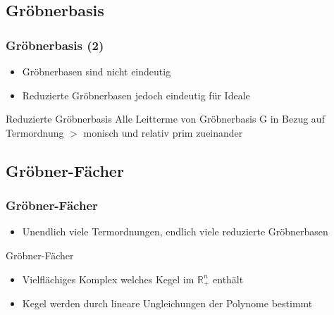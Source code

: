 \documentclass{beamer}
\begin{document}
\subsection{Gröbnerbasis}


\begin{frame}[fragile]
\frametitle{Gröbnerbasis (2)}

\begin{itemize}
\item Gröbnerbasen sind nicht eindeutig

\item Reduzierte Gröbnerbasen jedoch eindeutig für Ideale
\end{itemize}

\begin{block}{Reduzierte Gröbnerbasis}
Alle Leitterme von Gröbnerbasis G in Bezug auf Termordnung $>$ monisch und relativ prim zueinander 
\end{block}




\end{frame}







\subsection{Gröbner-Fächer}


\begin{frame}[fragile]
\frametitle{Gröbner-Fächer}
\begin{itemize}
\item Unendlich viele Termordnungen, endlich viele reduzierte Gröbnerbasen

\end{itemize}

\begin{block}{Gröbner-Fächer}
\begin{itemize}
\item Vielflächiges Komplex welches Kegel im $\mathbb{R}^{n}_{+}$ enthält
\item Kegel werden durch lineare Ungleichungen der Polynome bestimmt 
\end{itemize}

\end{block}

\end{frame}
\end{document}
